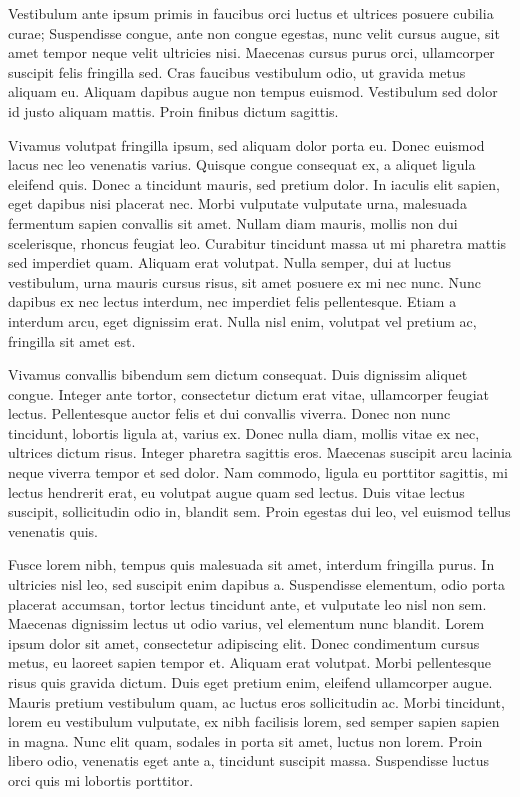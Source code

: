 Vestibulum ante ipsum primis in faucibus orci luctus et ultrices posuere cubilia curae; Suspendisse congue, ante non congue egestas, nunc velit cursus augue, sit amet tempor neque velit ultricies nisi. Maecenas cursus purus orci, ullamcorper suscipit felis fringilla sed. Cras faucibus vestibulum odio, ut gravida metus aliquam eu. Aliquam dapibus augue non tempus euismod. Vestibulum sed dolor id justo aliquam mattis. Proin finibus dictum sagittis.

Vivamus volutpat fringilla ipsum, sed aliquam dolor porta eu. Donec euismod lacus nec leo venenatis varius. Quisque congue consequat ex, a aliquet ligula eleifend quis. Donec a tincidunt mauris, sed pretium dolor. In iaculis elit sapien, eget dapibus nisi placerat nec. Morbi vulputate vulputate urna, malesuada fermentum sapien convallis sit amet. Nullam diam mauris, mollis non dui scelerisque, rhoncus feugiat leo. Curabitur tincidunt massa ut mi pharetra mattis sed imperdiet quam. Aliquam erat volutpat. Nulla semper, dui at luctus vestibulum, urna mauris cursus risus, sit amet posuere ex mi nec nunc. Nunc dapibus ex nec lectus interdum, nec imperdiet felis pellentesque. Etiam a interdum arcu, eget dignissim erat. Nulla nisl enim, volutpat vel pretium ac, fringilla sit amet est.

Vivamus convallis bibendum sem dictum consequat. Duis dignissim aliquet congue. Integer ante tortor, consectetur dictum erat vitae, ullamcorper feugiat lectus. Pellentesque auctor felis et dui convallis viverra. Donec non nunc tincidunt, lobortis ligula at, varius ex. Donec nulla diam, mollis vitae ex nec, ultrices dictum risus. Integer pharetra sagittis eros. Maecenas suscipit arcu lacinia neque viverra tempor et sed dolor. Nam commodo, ligula eu porttitor sagittis, mi lectus hendrerit erat, eu volutpat augue quam sed lectus. Duis vitae lectus suscipit, sollicitudin odio in, blandit sem. Proin egestas dui leo, vel euismod tellus venenatis quis.

Fusce lorem nibh, tempus quis malesuada sit amet, interdum fringilla purus. In ultricies nisl leo, sed suscipit enim dapibus a. Suspendisse elementum, odio porta placerat accumsan, tortor lectus tincidunt ante, et vulputate leo nisl non sem. Maecenas dignissim lectus ut odio varius, vel elementum nunc blandit. Lorem ipsum dolor sit amet, consectetur adipiscing elit. Donec condimentum cursus metus, eu laoreet sapien tempor et. Aliquam erat volutpat. Morbi pellentesque risus quis gravida dictum. Duis eget pretium enim, eleifend ullamcorper augue. Mauris pretium vestibulum quam, ac luctus eros sollicitudin ac. Morbi tincidunt, lorem eu vestibulum vulputate, ex nibh facilisis lorem, sed semper sapien sapien in magna. Nunc elit quam, sodales in porta sit amet, luctus non lorem. Proin libero odio, venenatis eget ante a, tincidunt suscipit massa. Suspendisse luctus orci quis mi lobortis porttitor.

